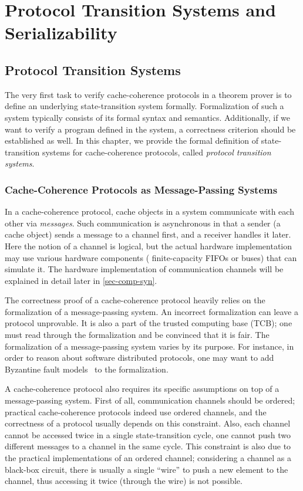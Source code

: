 \part{Protocol Transition Systems and Serializability}

\chapter{Protocol Transition Systems}
\label{sec-trs}

The very first task to verify cache-coherence protocols in a theorem prover is to define an underlying state-transition system formally.
Formalization of such a system typically consists of its formal syntax and semantics.
Additionally, if we want to verify a program defined in the system, a correctness criterion should be established as well.
In this chapter, we provide the formal definition of state-transition systems for cache-coherence protocols, called \emph{protocol transition systems}.

\section{Cache-Coherence Protocols as Message-Passing Systems}
\label{sec-cc-as-mp}

In a cache-coherence protocol, cache objects in a system communicate with each other via \emph{messages}.
Such communication is asynchronous in that a sender (a cache object) sends a message to a channel first, and a receiver handles it later.
Here the notion of a channel is logical, but the actual hardware implementation may use various hardware components (\eg{} finite-capacity FIFOs or buses) that can simulate it.
The hardware implementation of communication channels will be explained in detail later in \autoref{sec-comp-syn}.

The correctness proof of a cache-coherence protocol heavily relies on the formalization of a message-passing system.
An incorrect formalization can leave a protocol unprovable.
It is also a part of the trusted computing base (TCB); one must read through the formalization and be convinced that it is fair.
The formalization of a message-passing system varies by its purpose.
For instance, in order to reason about software distributed protocols, one may want to add Byzantine fault models~\cite{byzantine} to the formalization.

A cache-coherence protocol also requires its specific assumptions on top of a message-passing system.
First of all, communication channels should be ordered; practical cache-coherence protocols indeed use ordered channels, and the correctness of a protocol usually depends on this constraint.
Also, each channel cannot be accessed twice in a single state-transition cycle, \eg{} one cannot push two different messages to a channel in the same cycle.
This constraint is also due to the practical implementations of an ordered channel; considering a channel as a black-box circuit, there is usually a single ``wire'' to push a new element to the channel, thus accessing it twice (through the wire) is not possible.

